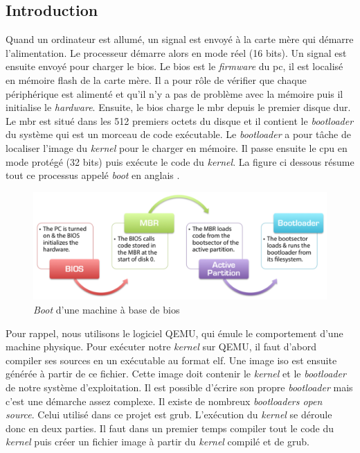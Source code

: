 \label{execution}

\subsection{Introduction}
Quand un ordinateur est allumé, un signal est envoyé à la carte mère qui démarre
l'alimentation. Le processeur démarre alors en mode réel (16 bits). Un signal
est ensuite envoyé pour charger le \acrshort{bios}. Le \acrshort{bios} est le
\textit{firmware} du \acrshort{pc}, il est localisé en mémoire flash de la carte
mère. Il a pour rôle de vérifier que chaque périphérique est alimenté et qu'il
n'y a pas de problème avec la mémoire puis il initialise le \textit{hardware}.
Ensuite, le \acrshort{bios} charge le \acrshort{mbr} depuis le premier disque dur.
Le \acrshort{mbr} est situé dans les 512 premiers octets du disque et il contient
le \textit{bootloader} du système qui est un morceau de code exécutable. Le
\textit{bootloader} a pour tâche de localiser l'image du \textit{kernel} pour le
charger en mémoire. Il passe ensuite le \acrshort{cpu} en mode protégé (32 bits) 
puis exécute le code du \textit{kernel}. La figure ci dessous résume tout
ce processus appelé \textit{boot} en anglais \cite{ref42}.

\begin{figure}[!h]
  \centering
  \includegraphics[scale=.45]{images/bios_boot.png}
  \caption{\textit{Boot} d'une machine à base de \acrshort{bios}}
  \label{fig:exec:boot}
\end{figure}

Pour rappel, nous utilisons le logiciel QEMU, qui émule le comportement d'une
machine physique. Pour exécuter notre \textit{kernel} sur QEMU, il faut d'abord
compiler ses sources en un exécutable au format \acrshort{elf}. Une image \acrshort{iso}
est ensuite générée à partir de ce fichier. Cette image doit contenir le
\textit{kernel} et le \textit{bootloader} de notre système d'exploitation.
Il est possible d'écrire son propre \textit{bootloader} mais c'est une démarche
assez complexe. Il existe de nombreux \textit{bootloaders open source}. Celui
utilisé dans ce projet est \acrshort{grub}. L'exécution du \textit{kernel} se
déroule donc en deux parties. Il faut dans un premier temps compiler tout le code
du \textit{kernel} puis créer un fichier image à partir du \textit{kernel}
compilé et de \acrshort{grub}.

